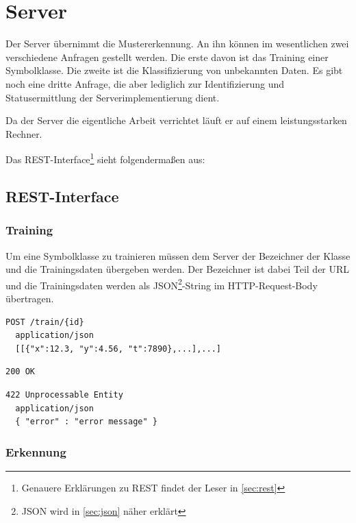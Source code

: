 

\section{Server} %
\label{sec:server}

Der Server übernimmt die Mustererkennung. An ihn können im wesentlichen zwei verschiedene Anfragen gestellt werden. Die erste davon ist das Training einer Symbolklasse. Die zweite ist die Klassifizierung von unbekannten Daten. Es gibt noch eine dritte Anfrage, die aber lediglich zur Identifizierung und Statusermittlung der Serverimplementierung dient.

Da der Server die eigentliche Arbeit verrichtet läuft er auf einem leistungsstarken Rechner.

Das \ac{REST}-Interface\footnote{Genauere Erklärungen zu \ac{REST} findet der Leser in \ref{sec:rest}} sieht folgendermaßen aus:

\subsection{REST-Interface} %
\label{sub:rest_interface}

\subsubsection{Training}

Um eine Symbolklasse zu trainieren müssen dem Server der Bezeichner der Klasse und die Trainingsdaten übergeben werden. Der Bezeichner ist dabei Teil der \ac{URL} und die Trainingsdaten werden als \ac{JSON}\footnote{JSON wird in \ref{sec:json} näher erklärt}-String im \ac{HTTP}-Request-Body übertragen.

\begin{lstlisting}[caption={Anfrage}]
  POST /train/{id}
  application/json
  [[{"x":12.3, "y":4.56, "t":7890},...],...]
\end{lstlisting}
\begin{lstlisting}[caption={Antwort}]
  200 OK
\end{lstlisting}
\begin{lstlisting}[caption={Antwort im Fehlerfall}]
  422 Unprocessable Entity
  application/json
  { "error" : "error message" }
\end{lstlisting}

\subsubsection{Erkennung}
\label{subsub:erkennung}

